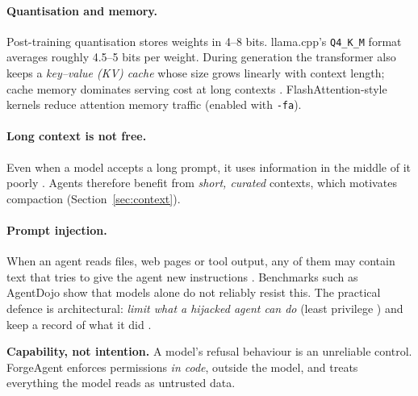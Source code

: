 \documentclass[11pt,a4paper]{article}
\begin{document}
\paragraph{Quantisation and memory.} Post-training quantisation \citep{dettmers2022llmint8,frantar2023gptq} stores weights in 4--8 bits. llama.cpp's \texttt{Q4\_K\_M}
format averages roughly 4.5--5 bits per weight. During generation the transformer \citep{vaswani2017attention} also keeps a \emph{key--value (KV) cache} whose size grows linearly with context length;
cache memory dominates serving cost at long contexts \citep{kwon2023vllm}. FlashAttention-style kernels \citep{dao2024flashattention2} reduce attention memory traffic (enabled with \texttt{-fa}).

\paragraph{Long context is not free.} Even when a model accepts a long prompt, it uses information in the middle of it poorly \citep{liu2024lost}. Agents therefore benefit from
\emph{short, curated} contexts, which motivates compaction (Section~\ref{sec:context}).

\paragraph{Prompt injection.} When an agent reads files, web pages or tool output, any of them may contain text that tries to give the agent new instructions
\citep{perez2022ignore,greshake2023indirect}. Benchmarks such as AgentDojo \citep{debenedetti2024agentdojo} show that models alone do not reliably resist this. The practical defence is architectural:
\emph{limit what a hijacked agent can do} (least privilege \citep{saltzer1975protection}) and keep a record of what it did \citep{owaspllm}.

\begin{keyidea}
\textbf{Capability, not intention.} A model's refusal behaviour is an unreliable control. ForgeAgent enforces permissions \emph{in code}, outside the model,
and treats everything the model reads as untrusted data.
\end{keyidea}

\end{document}
